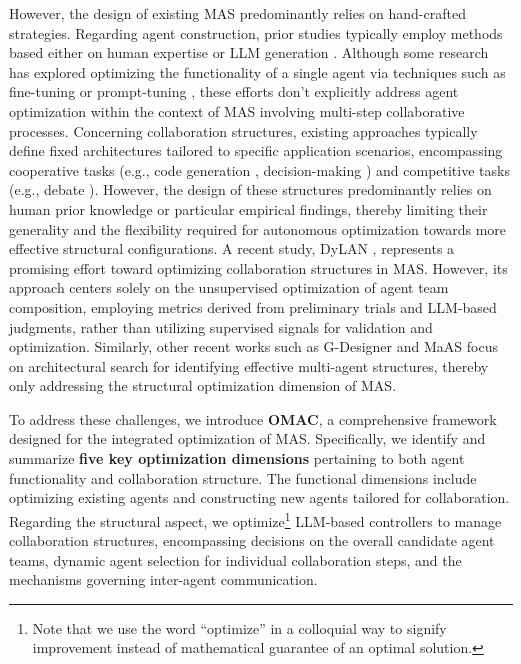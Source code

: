 However, the design of existing MAS predominantly relies on hand-crafted strategies. Regarding agent construction, prior studies typically employ methods based either on human expertise \cite{agentbench} or LLM generation \cite{multi-persona}. Although some research has explored optimizing the functionality of a single agent via techniques such as fine-tuning \cite{metatool} or prompt-tuning \cite{prompt_agent}, these efforts don't explicitly address agent optimization within the context of MAS involving multi-step collaborative processes.
Concerning collaboration structures, existing approaches typically define fixed architectures tailored to specific application scenarios, encompassing cooperative tasks (e.g., code generation \cite{self-collab-codegen}, decision-making \cite{software-dev}) and competitive tasks (e.g., debate \cite{debate1-mit}). However, the design of these structures predominantly relies on human prior knowledge or particular empirical findings, thereby limiting their generality and the flexibility required for autonomous optimization towards more effective structural configurations.
A recent study, DyLAN \cite{dylan}, represents a promising effort toward optimizing collaboration structures in MAS. However, its approach centers solely on the unsupervised optimization of agent team composition, employing metrics derived from preliminary trials and LLM-based judgments, rather than utilizing supervised signals for validation and optimization. Similarly,  other recent works
such as G-Designer \cite{zhang2025g} and MaAS \cite{zhang2025multi} focus on architectural search for identifying
effective multi-agent structures, thereby only addressing the structural optimization dimension of MAS.






To address these challenges, we introduce \textbf{OMAC}, a comprehensive framework designed for the integrated optimization of MAS. Specifically, we identify and summarize \textbf{five key optimization dimensions} pertaining to both agent functionality and collaboration structure. The functional dimensions include optimizing existing agents and constructing new agents tailored for collaboration. Regarding the structural aspect, we optimize\footnote{\scriptsize{Note that we use the word ``optimize'' in a colloquial way to signify improvement instead of mathematical guarantee of an optimal solution.}} 
LLM-based controllers to manage collaboration structures, encompassing decisions on the overall candidate agent teams, dynamic agent selection for individual collaboration steps, and the mechanisms governing inter-agent communication.

